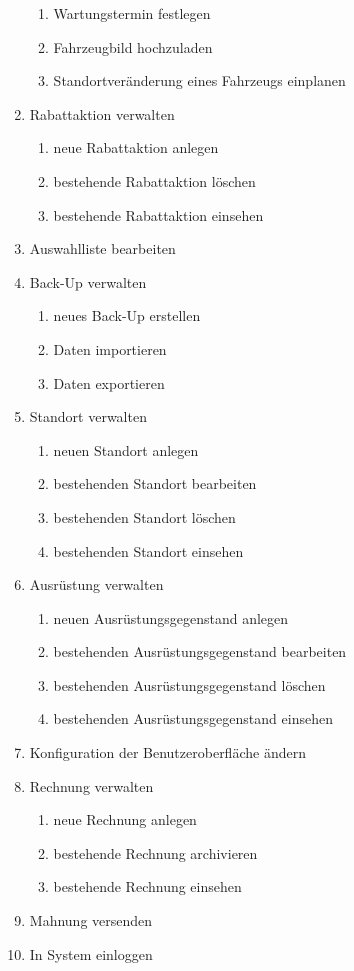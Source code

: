 \begin{enumerate}[itemsep= 0 cm]
\begin{enumerate}[itemsep= -0.25 cm]
        \item Wartungstermin festlegen
        \item Fahrzeugbild hochzuladen
        \item Standortveränderung eines Fahrzeugs einplanen
    \end{enumerate}
    \item Rabattaktion verwalten
    \begin{enumerate}[itemsep= -0.25 cm]
        \item neue Rabattaktion anlegen
        \item bestehende Rabattaktion löschen
        \item bestehende Rabattaktion einsehen
    \end{enumerate}
    \item Auswahlliste bearbeiten
    \item Back-Up verwalten
    \begin{enumerate}[itemsep= -0.25 cm]
        \item neues Back-Up erstellen
        \item Daten importieren
        \item Daten exportieren
    \end{enumerate}
    \item Standort verwalten
    \begin{enumerate}[itemsep= -0.25 cm]
        \item neuen Standort anlegen
        \item bestehenden Standort bearbeiten
        \item bestehenden Standort löschen
        \item bestehenden Standort einsehen
    \end{enumerate}
    \item Ausrüstung verwalten
    \begin{enumerate}[itemsep= -0.25 cm]
        \item neuen Ausrüstungsgegenstand anlegen
        \item bestehenden Ausrüstungsgegenstand bearbeiten
        \item bestehenden Ausrüstungsgegenstand löschen
        \item bestehenden Ausrüstungsgegenstand einsehen
    \end{enumerate}
    \item Konfiguration der Benutzeroberfläche ändern
    \item Rechnung verwalten
    \begin{enumerate}[itemsep= -0.25 cm]
        \item neue Rechnung anlegen
        \item bestehende Rechnung archivieren
        \item bestehende Rechnung einsehen
    \end{enumerate}
    \item Mahnung versenden
    \item In System einloggen
\end{enumerate}

